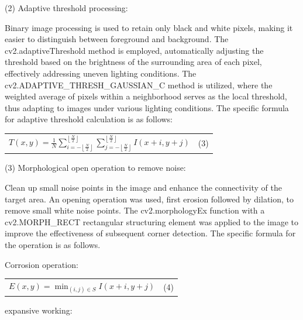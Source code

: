 \documentclass[
]{article}
\newcounter{none} %
\begin{document}
(2) Adaptive threshold processing:

Binary image processing is used to retain only black and white pixels,
making it easier to distinguish between foreground and background. The
cv2.adaptiveThreshold method is employed, automatically adjusting the
threshold based on the brightness of the surrounding area of each pixel,
effectively addressing uneven lighting conditions. The
cv2.ADAPTIVE\_THRESH\_GAUSSIAN\_C method is utilized, where the weighted
average of pixels within a neighborhood serves as the local threshold,
thus adapting to images under various lighting conditions. The specific
formula for adaptive threshold calculation is as follows:

{\def\LTcaptype{none} %
\begin{longtable}[]{@{}
  >{\raggedright\arraybackslash}p{}
  >{\centering\arraybackslash}p{}@{}}
\toprule\noalign{}
\endhead
\bottomrule\noalign{}
\endlastfoot
\(T(x,y) = \frac{1}{N}\sum_{i = - \left\lfloor \frac{N}{2} \right\rfloor}^{\left\lfloor \frac{N}{2} \right\rfloor}{\sum_{j = - \left\lfloor \frac{N}{2} \right\rfloor}^{\left\lfloor \frac{N}{2} \right\rfloor}{I(x + i,y + j)}}\)
& (3) \\
\end{longtable}
}

(3) Morphological open operation to remove noise:

Clean up small noise points in the image and enhance the connectivity of
the target area. An opening operation was used, first erosion followed
by dilation, to remove small white noise points. The cv2.morphologyEx
function with a cv2.MORPH\_RECT rectangular structuring element was
applied to the image to improve the effectiveness of subsequent corner
detection. The specific formula for the operation is as follows.

Corrosion operation:

{\def\LTcaptype{none} %
\begin{longtable}[]{@{}
  >{\raggedright\arraybackslash}p{}
  >{\centering\arraybackslash}p{}@{}}
\toprule\noalign{}
\endhead
\bottomrule\noalign{}
\endlastfoot
\(E(x,y) = \min_{(i,j) \in S}I(x + i,y + j)\) & (4) \\
\end{longtable}
}

expansive working:
\end{document}
